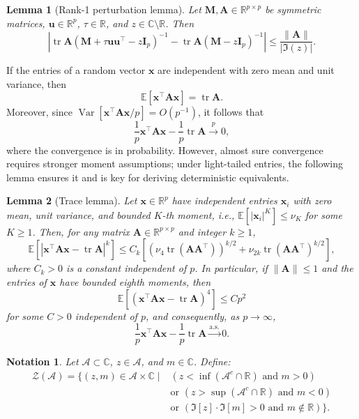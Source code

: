 \documentclass[12pt]{article}
\newtheorem{lemma}{Lemma}
\newtheorem{notation}{Notation}
\DeclareMathOperator{\tr}{tr}
\begin{document}
\begin{lemma}[Rank-1 perturbation lemma] \label{lem:rank-1-perturbation}
Let $\mathbf{M}, \mathbf{A} \in \mathbb{R}^{p \times p}$ be symmetric matrices, $\mathbf{u} \in \mathbb{R}^p$, $\tau \in \mathbb{R}$, and $z \in \mathbb{C} \setminus \mathbb{R}$. Then
$$
\left| \tr \mathbf{A} (\mathbf{M} + \tau \mathbf{u} \mathbf{u}^\top - z \mathbf{I}_p)^{-1} - \tr \mathbf{A} (\mathbf{M} - z \mathbf{I}_p)^{-1} \right| \leq \frac{\|\mathbf{A}\|}{|\Im(z)|}.
$$
\end{lemma}

If the entries of a random vector $\mathbf{x}$ are independent with zero mean and unit variance, then
$$
\mathbb{E}[\mathbf{x}^\top \mathbf{A} \mathbf{x}] = \tr \mathbf{A}.
$$
Moreover, since $\operatorname{Var}[\mathbf{x}^\top \mathbf{A} \mathbf{x} / p] = O(p^{-1})$, it follows that
$$
\frac{1}{p} \mathbf{x}^\top \mathbf{A} \mathbf{x} - \frac{1}{p} \tr \mathbf{A} \xrightarrow{p} 0,
$$
where the convergence is in probability. However, almost sure convergence requires stronger moment assumptions; under light-tailed entries, the following lemma ensures it and is key for deriving deterministic equivalents.

\begin{lemma}[Trace lemma]\label{lem:trace}
Let $\mathbf{x} \in \mathbb{R}^p$ have independent entries $\mathbf{x}_i$ with zero mean, unit variance, and bounded $K$-th moment, i.e., $\mathbb{E}[|\mathbf{x}_i|^K] \leq \nu_K$ for some $K \ge 1$. Then, for any matrix $\mathbf{A} \in \mathbb{R}^{p \times p}$ and integer $k \ge 1$,
$$
\mathbb{E}\left[|\mathbf{x}^\top \mathbf{A} \mathbf{x} - \tr \mathbf{A}|^k \right] \leq C_k \left[ (\nu_4 \tr(\mathbf{A} \mathbf{A}^\top))^{k/2} + \nu_{2k} \tr(\mathbf{A} \mathbf{A}^\top)^{k/2} \right],
$$
where $C_k > 0$ is a constant independent of $p$. In particular, if $\|\mathbf{A}\| \leq 1$ and the entries of $\mathbf{x}$ have bounded eighth moments, then
$$
\mathbb{E} \left[ (\mathbf{x}^\top \mathbf{A} \mathbf{x} - \tr \mathbf{A})^4 \right] \leq C p^2
$$
for some $C > 0$ independent of $p$, and consequently, as $p \to \infty$,
$$
\frac{1}{p} \mathbf{x}^\top \mathbf{A} \mathbf{x} - \frac{1}{p} \tr \mathbf{A} \xrightarrow{\text{a.s.}} 0.
$$
\end{lemma}

\begin{notation}
Let $\mathcal{A} \subset \mathbb{C}$, $z \in \mathcal{A}$, and $m \in \mathbb{C}$. Define:
\begin{align*}
\mathcal{Z}(\mathcal{A}) = \{ (z, m) \in \mathcal{A} \times \mathbb{C} \mid & (z < \inf(\mathcal{A}^c \cap \mathbb{R}) \text{ and } m > 0) \\
& \text{or } (z > \sup(\mathcal{A}^c \cap \mathbb{R}) \text{ and } m < 0) \\
& \text{or } (\Im[z] \cdot \Im[m] > 0 \text{ and } m \notin \mathbb{R}) \}.
\end{align*}
\end{notation}
\end{document}
